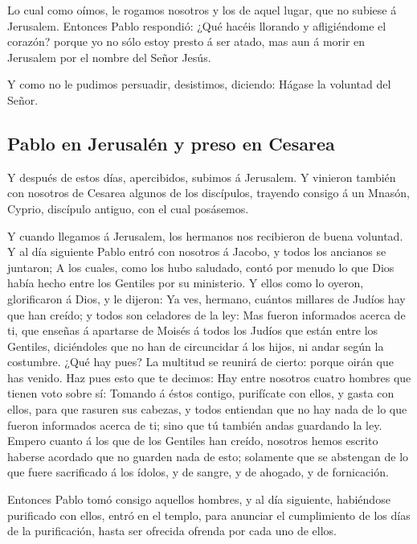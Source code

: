  Lo cual como oímos, le rogamos nosotros y los de aquel
lugar, que no subiese á Jerusalem.  Entonces Pablo
respondió: ¿Qué hacéis llorando y afligiéndome el corazón? porque yo no
sólo estoy presto á ser atado, mas aun á morir en Jerusalem por el
nombre del Señor Jesús.

 Y como no le pudimos persuadir, desistimos, diciendo:
Hágase la voluntad del Señor.

\hypertarget{pablo-en-jerusaluxe9n-y-preso-en-cesarea}{%
\subsection{Pablo en Jerusalén y preso en
Cesarea}\label{pablo-en-jerusaluxe9n-y-preso-en-cesarea}}

 Y después de estos días, apercibidos, subimos á Jerusalem.
 Y vinieron también con nosotros de Cesarea algunos de los
discípulos, trayendo consigo á un Mnasón, Cyprio, discípulo antiguo, con
el cual posásemos.

 Y cuando llegamos á Jerusalem, los hermanos nos recibieron
de buena voluntad.  Y al día siguiente Pablo entró con
nosotros á Jacobo, y todos los ancianos se juntaron;  A los
cuales, como los hubo saludado, contó por menudo lo que Dios había hecho
entre los Gentiles por su ministerio.  Y ellos como lo
oyeron, glorificaron á Dios, y le dijeron: Ya ves, hermano, cuántos
millares de Judíos hay que han creído; y todos son celadores de la ley:
 Mas fueron informados acerca de ti, que enseñas á
apartarse de Moisés á todos los Judíos que están entre los Gentiles,
diciéndoles que no han de circuncidar á los hijos, ni andar según la
costumbre.  ¿Qué hay pues? La multitud se reunirá de
cierto: porque oirán que has venido.  Haz pues esto que te
decimos: Hay entre nosotros cuatro hombres que tienen voto sobre sí:
 Tomando á éstos contigo, purifícate con ellos, y gasta con
ellos, para que rasuren sus cabezas, y todos entiendan que no hay nada
de lo que fueron informados acerca de ti; sino que tú también andas
guardando la ley.  Empero cuanto á los que de los Gentiles
han creído, nosotros hemos escrito haberse acordado que no guarden nada
de esto; solamente que se abstengan de lo que fuere sacrificado á los
ídolos, y de sangre, y de ahogado, y de fornicación.

 Entonces Pablo tomó consigo aquellos hombres, y al día
siguiente, habiéndose purificado con ellos, entró en el templo, para
anunciar el cumplimiento de los días de la purificación, hasta ser
ofrecida ofrenda por cada uno de ellos.

